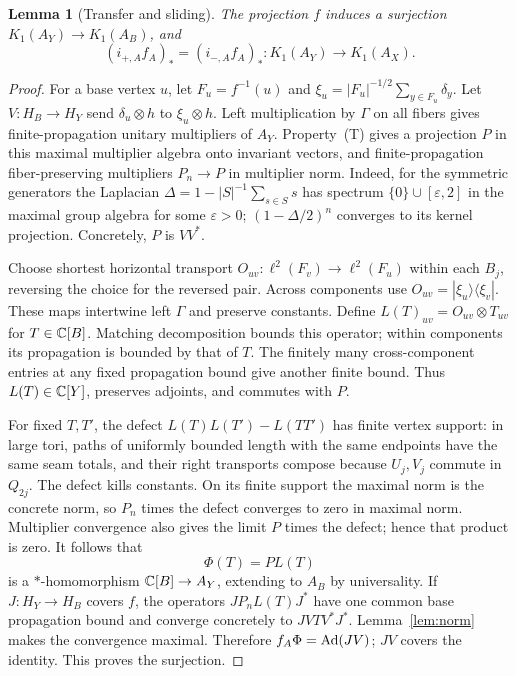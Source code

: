 \documentclass[11pt]{article}
\newtheorem{lemma}[theorem]{Lemma}
\theoremstyle{remark}\newtheorem{remark}[theorem]{Remark}
\begin{document}
\begin{lemma}[Transfer and sliding]\label{lem:analytic}
The projection $f$ induces a surjection $K_1(A_Y)\to K_1(A_B)$, and
\[
 (i_{+,A}f_A)_*=(i_{-,A}f_A)_*:K_1(A_Y)\to K_1(A_X).
\]
\end{lemma}
\begin{proof}
For a base vertex $u$, let $F_u=f^{-1}(u)$ and
$\xi_u=|F_u|^{-1/2}\sum_{y\in F_u}\delta_y$.
Let $V:H_B\to H_Y$ send $\delta_u\otimes h$ to $\xi_u\otimes h$.
Left multiplication by $\Gamma$ on all fibers gives finite-propagation
unitary multipliers of $A_Y$. Property~(T) gives a projection $P$ in this
maximal multiplier algebra onto invariant vectors, and finite-propagation
fiber-preserving multipliers $P_n\to P$ in multiplier norm.
Indeed, for the symmetric generators the Laplacian
$\Delta=1-|S|^{-1}\sum_{s\in S}s$ has spectrum
$\{0\}\cup[\varepsilon,2]$ in the maximal group algebra for some
$\varepsilon>0$; $(1-\Delta/2)^n$ converges to its kernel projection.
Concretely, $P$ is $VV^*$.

Choose shortest horizontal transport $O_{uv}:\ell^2(F_v)\to\ell^2(F_u)$
within each $B_j$, reversing the choice for the reversed pair. Across
components use $O_{uv}=|\xi_u\rangle\langle\xi_v|$.
These maps intertwine left $\Gamma$ and preserve constants.
Define $L(T)_{uv}=O_{uv}\otimes T_{uv}$ for $T\in\mathbb C[B]$.
Matching decomposition bounds this operator; within components its
propagation is bounded by that of $T$. The finitely many cross-component
entries at any fixed propagation bound give another finite bound.
Thus $L(T)\in\mathbb C[Y]$, preserves adjoints, and commutes with $P$.

For fixed $T,T'$, the defect $L(T)L(T')-L(TT')$ has finite vertex support:
in large tori, paths of uniformly bounded length with the same endpoints
have the same seam totals, and their right transports compose because
$U_j,V_j$ commute in $Q_{2j}$. The defect kills constants. On its finite
support the maximal norm is the concrete norm, so $P_n$ times the defect
converges to zero in maximal norm. Multiplier convergence also gives the
limit $P$ times the defect; hence that product is zero. It follows that
\[
 \Phi(T)=PL(T)
\]
is a $*$-homomorphism $\mathbb C[B]\to A_Y$, extending to $A_B$ by universality.
If $J:H_Y\to H_B$ covers $f$, the operators $JP_nL(T)J^*$ have one common
base propagation bound and converge concretely to $JVT V^*J^*$.
Lemma~\ref{lem:norm} makes the convergence maximal. Therefore
$f_A\Phi=\operatorname{Ad}(JV)$; $JV$ covers the identity. This proves the surjection.


\end{proof}
\end{document}
